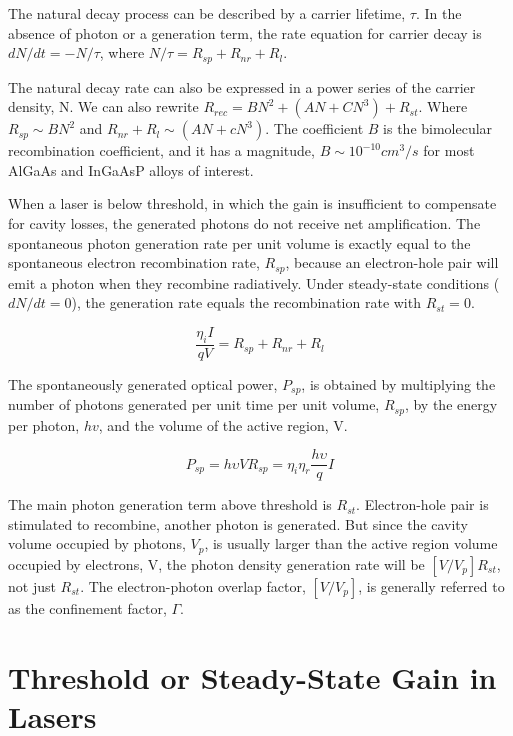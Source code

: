 The natural decay process can be described by a carrier lifetime, $\tau$. In
the absence of photon or a generation term, the rate equation for carrier decay
is $dN/dt = -N/\tau$, where $N/\tau = R_{sp} + R_{nr} + R_{l}$.

The natural decay rate can also be expressed in a power series of the carrier
density, N. We can also rewrite $R_{rec} = BN^2 + (AN + CN^3) + R_{st}$. Where
$R_{sp} \sim BN^2$ and $R_{nr} + R_{l} \sim (AN + cN^3)$. The coefficient $B$
is the bimolecular recombination coefficient, and it has a magnitude, $B \sim
10^{-10} cm^3/s$ for most AlGaAs and InGaAsP alloys of interest.

When a laser is below threshold, in which the gain is insufficient to
compensate for cavity losses, the generated photons do not receive net
amplification. The spontaneous photon generation rate per unit volume is
exactly equal to the spontaneous electron recombination rate, $R_{sp}$, because
an electron-hole pair will emit a photon when they recombine radiatively.
Under steady-state conditions ($dN/dt = 0$), the generation rate equals the
recombination rate with $R_{st} = 0$.

\begin{equation}
  \frac{\eta_{i}I}{qV} = R_{sp} + R_{nr} + R_{l}
\end{equation}

The spontaneously generated optical power, $P_{sp}$, is obtained by multiplying
the number of photons generated per unit time per unit volume, $R_{sp}$, by the
energy per photon, $hv$, and the volume of the active region, V.

\begin{equation}
  P_{sp} = h{\upsilon}VR_{sp} = \eta_i\eta_r\frac{h\upsilon}{q}I
\end{equation}

The main photon generation term above threshold is $R_{st}$. Electron-hole pair
is stimulated to recombine, another photon is generated. But since the cavity
volume occupied by photons, $V_p$, is usually larger than the active region
volume occupied by electrons, V, the photon density generation rate will be
$[V/V_p]R_{st}$, not just $R_{st}$. The electron-photon overlap factor,
$[V/V_p]$, is generally referred to as the confinement factor, $\Gamma$.

\section[Steady-State Gain]{Threshold or Steady-State Gain in Lasers} \label{sec:steadystate}


